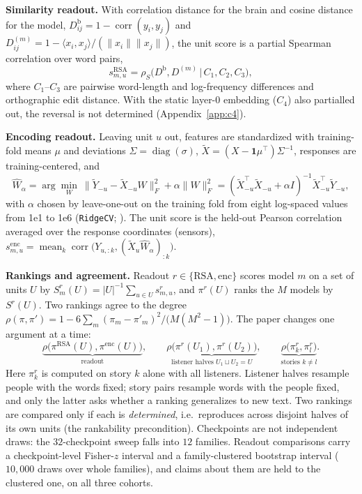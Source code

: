 \documentclass{article}
\begin{document}
\textbf{Similarity readout.} With correlation distance for the brain and cosine distance for the
model, $D^{\mathrm b}_{ij} = 1-\operatorname{corr}(y_i,y_j)$ and
$D^{(m)}_{ij} = 1-\langle x_i,x_j\rangle/(\|x_i\|\|x_j\|)$, the unit score is a partial Spearman
correlation over word pairs,
\begin{equation}\label{eq:rsa}
s^{\mathrm{RSA}}_{m,u} = \rho_S\bigl(D^{\mathrm b}, D^{(m)} \,\big|\, C_1, C_2, C_3\bigr),
\end{equation}
where $C_1$--$C_3$ are pairwise word-length and log-frequency differences and orthographic edit
distance.
With the static layer-0 embedding ($C_4$) also partialled out, the reversal is not determined (Appendix~\ref{app:c4}).

\textbf{Encoding readout.} Leaving unit $u$ out, features are standardized with training-fold
means $\mu$ and deviations $\Sigma=\operatorname{diag}(\sigma)$, $\tilde X = (X-\mathbf 1\mu^\top)\Sigma^{-1}$, responses are
training-centered, and
\begin{equation}\label{eq:ridge}
\hat W_\alpha = \arg\min_{W}\ \|\tilde Y_{-u}-\tilde X_{-u}W\|_F^2+\alpha\|W\|_F^2
 = (\tilde X_{-u}^\top\tilde X_{-u}+\alpha I)^{-1}\tilde X_{-u}^\top\tilde Y_{-u},
\end{equation}
with $\alpha$ chosen by leave-one-out on the training fold from eight log-spaced values from 1e1 to 1e6
(\texttt{RidgeCV}; \citealp{pedregosa2011scikit}). The unit score is
the held-out Pearson correlation averaged over the response coordinates (sensors),
$s^{\mathrm{enc}}_{m,u}=\operatorname{mean}_{k}\operatorname{corr}\bigl(Y_{u,:k},(\tilde X_u\hat W_\alpha)_{:k}\bigr)$.

\textbf{Rankings and agreement.} Readout $r\in\{\mathrm{RSA},\mathrm{enc}\}$ scores model $m$ on
a set of units $U$ by $S^r_m(U)=|U|^{-1}\sum_{u\in U}s^r_{m,u}$, and $\pi^r(U)$ ranks the $M$
models by $S^r(U)$. Two rankings agree to the degree
$\rho(\pi,\pi')=1-6\sum_m(\pi_m-\pi'_m)^2/\bigl(M(M^2-1)\bigr)$. The paper changes one argument at
a time:
\begin{equation}\label{eq:agree}
\underbrace{\rho\bigl(\pi^{\mathrm{RSA}}(U),\pi^{\mathrm{enc}}(U)\bigr)}_{\text{readout}},\qquad
\underbrace{\rho\bigl(\pi^{r}(U_1),\pi^{r}(U_2)\bigr)}_{\text{listener halves }U_1\sqcup U_2=U},\qquad
\underbrace{\rho\bigl(\pi^{r}_{k},\pi^{r}_{l}\bigr)}_{\text{stories }k\neq l}.
\end{equation}
Here $\pi^r_k$ is computed on story $k$ alone with all listeners. Listener halves resample people
with the words fixed; story pairs resample words with the people fixed, and only the latter asks
whether a ranking generalizes to new text. Two rankings are compared only if each is \emph{determined}, i.e.\ reproduces across disjoint
halves of its own units (the rankability precondition). Checkpoints are not independent
draws: the $32$-checkpoint sweep falls into $12$ families. Readout comparisons carry
a checkpoint-level Fisher-$z$ interval and a family-clustered bootstrap interval ($10{,}000$ draws
over whole families), and claims about them are held to the clustered one, on all three cohorts.
\end{document}
